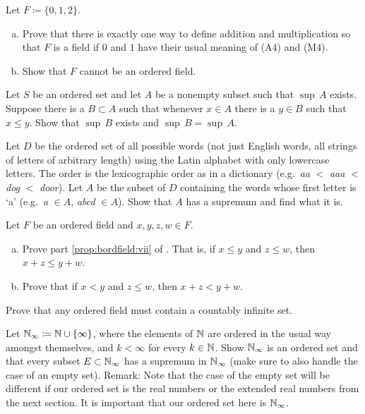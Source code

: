 \begin{exercise}
\pagebreak[2]
Let $F \coloneqq \{ 0, 1, 2 \}$.
\begin{enumerate}[a)]
\item
Prove that there is
exactly one way to define addition and multiplication so that $F$ is
a field if $0$ and $1$ have their usual meaning of (A4) and (M4).
\item
Show that $F$ cannot be an ordered field.
\end{enumerate}
\end{exercise}

\begin{exercise} \label{exercise:dominatingb}
\pagebreak[2]
Let $S$ be an ordered set and
let $A$ be a nonempty subset such that $\sup \, A$ exists.  Suppose there
is a $B \subset A$ such that whenever $x \in A$ there is a $y \in B$
such that $x \leq y$.  Show that $\sup \, B$ exists and $\sup \, B = \sup \, A$.
\end{exercise}

\begin{exercise}
Let $D$ be the ordered set of all possible words (not just English words,
all strings of letters of arbitrary length)
using the Latin alphabet with only lowercase letters.  The order is the
lexicographic order as in a dictionary (e.g.\ \emph{aa} $<$ \emph{aaa} $<$ \emph{dog} $<$ \emph{door}).
Let $A$ be the subset of $D$ containing the words whose
first letter is `a' (e.g.\ \emph{a} $\in A$, \emph{abcd} $\in A$).
Show that $A$ has a supremum and find what it is.
\end{exercise}

\begin{exercise}
Let $F$ be an ordered field and $x,y,z,w \in F$.
\begin{enumerate}[a)]
\item
Prove part \ref{prop:bordfield:vii} of .
That is,
if $x \leq y$ and $z \leq w$, then $x+z \leq y+w$.
\item
Prove that
if $x < y$ and $z \leq w$, then $x+z < y+w$.
\end{enumerate}
\end{exercise}

\begin{exercise}
Prove that any ordered field must contain a countably infinite set.
\end{exercise}

\begin{exercise}
Let ${\mathbb{N}}_{\infty} \coloneqq {\mathbb{N}} \cup \{ \infty \}$, where the elements of ${\mathbb{N}}$ are
ordered in the usual way amongst themselves,
and $k < \infty$ for every $k \in {\mathbb{N}}$.  Show ${\mathbb{N}}_{\infty}$ is an ordered set
and that every subset $E \subset {\mathbb{N}}_{\infty}$ has a supremum in
${\mathbb{N}}_{\infty}$ (make sure to also handle the case of an empty set).
Remark: Note that the case of the empty set will be different
if our ordered set is the real numbers or the extended
real numbers from the next section.  It is important that
our ordered set here is ${\mathbb{N}}_{\infty}$.
\end{exercise}


